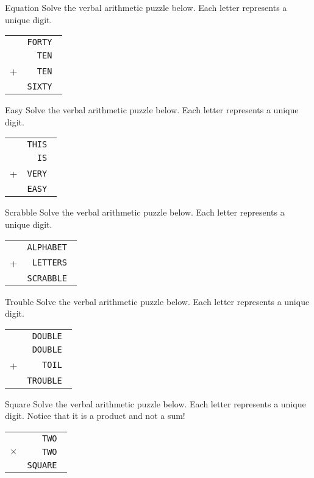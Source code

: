 \documentclass[12pt,letterpaper]{article}
\begin{document}
\begin{problem}{Equation}
Solve the verbal arithmetic puzzle below. Each letter represents a unique digit.

\begin{center}
 \begin{tabular}{rr}
  & \tt FORTY \\
  & \tt TEN \\
  + & \tt TEN \\
  \hline
  & \tt SIXTY
 \end{tabular}
\end{center}
\end{problem}

\begin{problem}{Easy}
Solve the verbal arithmetic puzzle below. Each letter represents a unique digit.

\begin{center}
 \begin{tabular}{rr}
  & \tt THIS \\
  & \tt IS \\
  + & \tt VERY \\
  \hline
  & \tt EASY
 \end{tabular}
\end{center}
\end{problem}

\begin{problem}{Scrabble}
Solve the verbal arithmetic puzzle below. Each letter represents a unique digit.

\begin{center}
 \begin{tabular}{rr}
  & \tt ALPHABET \\
  + & \tt LETTERS \\
  \hline
  & \tt SCRABBLE
 \end{tabular}
\end{center}
\end{problem}

\begin{problem}{Trouble}
Solve the verbal arithmetic puzzle below. Each letter represents a unique digit.

\begin{center}
 \begin{tabular}{rr}
  & \tt DOUBLE \\
  & \tt DOUBLE \\
  + & \tt TOIL \\
  \hline
  & \tt TROUBLE
 \end{tabular}
\end{center}
\end{problem}

\begin{problem}{Square}
Solve the verbal arithmetic puzzle below. Each letter represents a unique digit.
Notice that it is a product and not a sum!

\begin{center}
 \begin{tabular}{rr}
  & \tt TWO \\
  $\times$ & \tt TWO \\
  \hline
  & \tt SQUARE
 \end{tabular}
\end{center}
\end{problem}
\end{document}
